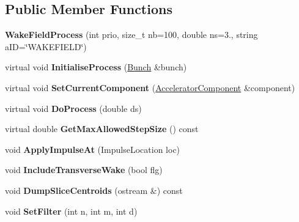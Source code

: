 \subsection*{Public Member Functions}
\begin{DoxyCompactItemize}
\item 
\mbox{\label{classParticleTracking_1_1WakeFieldProcess_a41dd0a60d75e81c6a7c3dea750b46fc1}} 
{\bfseries Wake\+Field\+Process} (int prio, size\+\_\+t nb=100, double ns=3., string a\+ID=\char`\"{}W\+A\+K\+E\+F\+I\+E\+LD\char`\"{})
\item 
\mbox{\label{classParticleTracking_1_1WakeFieldProcess_ae5a908f04f109abdfa1a16451ca9f2a9}} 
virtual void {\bfseries Initialise\+Process} (\hyperlink{classBunch}{Bunch} \&bunch)
\item 
\mbox{\label{classParticleTracking_1_1WakeFieldProcess_a9f29981e6dc8f54513fb228b25d33038}} 
virtual void {\bfseries Set\+Current\+Component} (\hyperlink{classAcceleratorComponent}{Accelerator\+Component} \&component)
\item 
\mbox{\label{classParticleTracking_1_1WakeFieldProcess_a2ad74df641b0917c485779702dab6ccb}} 
virtual void {\bfseries Do\+Process} (double ds)
\item 
\mbox{\label{classParticleTracking_1_1WakeFieldProcess_a691495b9a80345b08e272b255bff0df0}} 
virtual double {\bfseries Get\+Max\+Allowed\+Step\+Size} () const
\item 
\mbox{\label{classParticleTracking_1_1WakeFieldProcess_af9b823607eeda63d0e1767ba8a0b3541}} 
void {\bfseries Apply\+Impulse\+At} (Impulse\+Location loc)
\item 
\mbox{\label{classParticleTracking_1_1WakeFieldProcess_a4c99283c0256613e38562014d0657132}} 
void {\bfseries Include\+Transverse\+Wake} (bool flg)
\item 
\mbox{\label{classParticleTracking_1_1WakeFieldProcess_a8a7dd612c3444919d0c63438a25c9c8a}} 
void {\bfseries Dump\+Slice\+Centroids} (ostream \&) const
\item 
\mbox{\label{classParticleTracking_1_1WakeFieldProcess_ab840d814766c7eeae8925576f9466ddf}} 
void {\bfseries Set\+Filter} (int n, int m, int d)
\end{DoxyCompactItemize}
